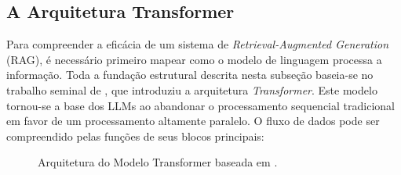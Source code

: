 \subsection{A Arquitetura Transformer}

Para compreender a eficácia de um sistema de \textit{Retrieval-Augmented Generation} (RAG), é necessário primeiro mapear como o modelo de linguagem processa a informação. Toda a fundação estrutural descrita nesta subseção baseia-se no trabalho seminal de \citet{vaswani2017}, que introduziu a arquitetura \textit{Transformer}. Este modelo tornou-se a base dos LLMs ao abandonar o processamento sequencial tradicional em favor de um processamento altamente paralelo. O fluxo de dados pode ser compreendido pelas funções de seus blocos principais:

\begin{figure}[!htb]
  \centering
  
  \caption{Arquitetura do Modelo Transformer baseada em \citet{vaswani2017}.}
  \label{fig:transformer}
\end{figure}

